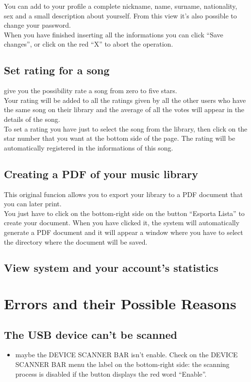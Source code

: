 You can add to your profile a complete nickname, name, surname, nationality, sex
and a small description about yourself. From this view it's also possible to change
your password.\\
When you have finished inserting all the informations you can click ``Save
changes'', or click on the red ``X'' to abort the operation.

\subsection*{Set rating for a song}

 give you the possibility rate a song from zero to five
stars.\\
Your rating will be added to all the ratings given by all the other users who
have the same song on their library and the average of all the votes will appear
in the details of the song.\\
To set a rating you have just to select the song from the library, then click on
the star number that you want at the bottom side of the page. The rating will be
automatically registered in the informations of this song.

\subsection*{Creating a PDF of your music library}

This original funcion allows you to export your library to a PDF document that
you can later print.\\
You just have to click on the bottom-right side on the button ``Esporta Lista''
to create your document. When you have clicked it, the system will automatically
generate a PDF document and it will appear a window where you have to select the
directory where the document will be saved.

\subsection*{View system and your account's statistics}


\newpage
\section{Errors and their Possible Reasons}

\subsection*{The USB device can't be scanned}
\begin{itemize}
  \item maybe the DEVICE SCANNER BAR isn't enable. Check on the DEVICE SCANNER
  BAR menu the label on the bottom-right side: the scanning process is disabled
  if the button displays the red word ``Enable''.
\end{itemize}

